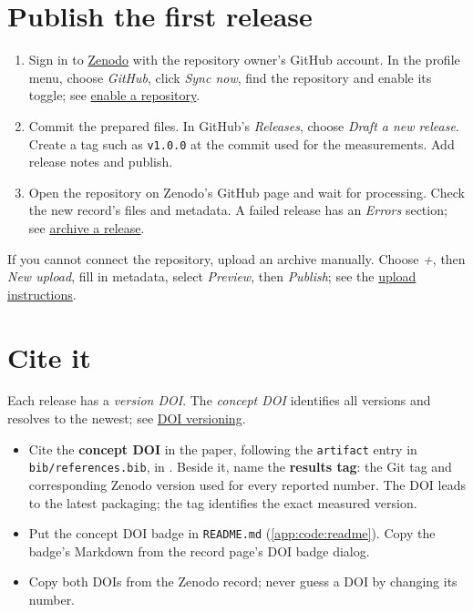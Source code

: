 \section{Publish the first release}
\begin{enumerate}
  \item Sign in to \href{https://zenodo.org/}{Zenodo} with the repository owner's GitHub account. In the profile menu, choose \emph{GitHub}, click \emph{Sync now}, find the repository and enable its toggle; see \href{https://help.zenodo.org/docs/github/enable-repository/}{enable a repository}.
  \item Commit the prepared files. In GitHub's \emph{Releases}, choose \emph{Draft a new release}. Create a tag such as \texttt{v1.0.0} at the commit used for the measurements. Add release notes and publish.
  \item Open the repository on Zenodo's GitHub page and wait for processing. Check the new record's files and metadata. A failed release has an \emph{Errors} section; see \href{https://help.zenodo.org/docs/github/archive-software/github-upload/}{archive a release}.
\end{enumerate}
If you cannot connect the repository, upload an archive manually. Choose \emph{+}, then \emph{New upload}, fill in metadata, select \emph{Preview}, then \emph{Publish}; see the \href{https://help.zenodo.org/docs/deposit/create-new-upload/}{upload instructions}.

\section{Cite it}\label{app:zenodo:cite}
Each release has a \emph{version DOI}. The \emph{concept DOI} identifies all versions and resolves to the newest; see \href{https://support.zenodo.org/help/en-gb/1-upload-deposit/97-what-is-doi-versioning}{DOI versioning}.
\begin{itemize}
  \item Cite the \textbf{concept DOI} in the paper, following the \texttt{artifact} entry in \texttt{bib/references.bib}, in . Beside it, name the \textbf{results tag}: the Git tag and corresponding Zenodo version used for every reported number. The DOI leads to the latest packaging; the tag identifies the exact measured version.
  \item Put the concept DOI badge in \texttt{README.md} (\cref{app:code:readme}). Copy the badge's Markdown from the record page's DOI badge dialog.
  \item Copy both DOIs from the Zenodo record; never guess a DOI by changing its number.
\end{itemize}

